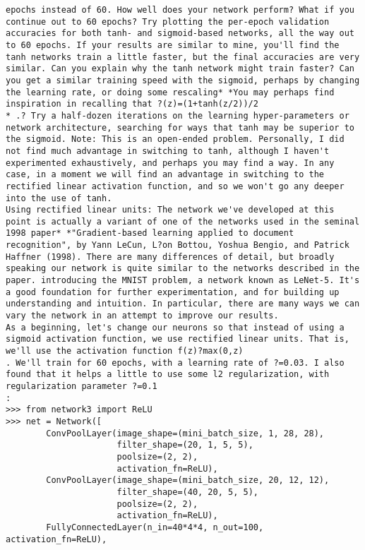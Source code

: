 \begin{lstlisting}
epochs instead of 60. How well does your network perform? What if you continue out to 60 epochs? Try plotting the per-epoch validation accuracies for both tanh- and sigmoid-based networks, all the way out to 60 epochs. If your results are similar to mine, you'll find the tanh networks train a little faster, but the final accuracies are very similar. Can you explain why the tanh network might train faster? Can you get a similar training speed with the sigmoid, perhaps by changing the learning rate, or doing some rescaling* *You may perhaps find inspiration in recalling that ?(z)=(1+tanh(z/2))/2
* .? Try a half-dozen iterations on the learning hyper-parameters or network architecture, searching for ways that tanh may be superior to the sigmoid. Note: This is an open-ended problem. Personally, I did not find much advantage in switching to tanh, although I haven't experimented exhaustively, and perhaps you may find a way. In any case, in a moment we will find an advantage in switching to the rectified linear activation function, and so we won't go any deeper into the use of tanh. 
Using rectified linear units: The network we've developed at this point is actually a variant of one of the networks used in the seminal 1998 paper* *"Gradient-based learning applied to document recognition", by Yann LeCun, L?on Bottou, Yoshua Bengio, and Patrick Haffner (1998). There are many differences of detail, but broadly speaking our network is quite similar to the networks described in the paper. introducing the MNIST problem, a network known as LeNet-5. It's a good foundation for further experimentation, and for building up understanding and intuition. In particular, there are many ways we can vary the network in an attempt to improve our results.
As a beginning, let's change our neurons so that instead of using a sigmoid activation function, we use rectified linear units. That is, we'll use the activation function f(z)?max(0,z)
. We'll train for 60 epochs, with a learning rate of ?=0.03. I also found that it helps a little to use some l2 regularization, with regularization parameter ?=0.1
:
>>> from network3 import ReLU
>>> net = Network([
        ConvPoolLayer(image_shape=(mini_batch_size, 1, 28, 28), 
                      filter_shape=(20, 1, 5, 5), 
                      poolsize=(2, 2), 
                      activation_fn=ReLU),
        ConvPoolLayer(image_shape=(mini_batch_size, 20, 12, 12), 
                      filter_shape=(40, 20, 5, 5), 
                      poolsize=(2, 2), 
                      activation_fn=ReLU),
        FullyConnectedLayer(n_in=40*4*4, n_out=100, activation_fn=ReLU),

\end{lstlisting}
